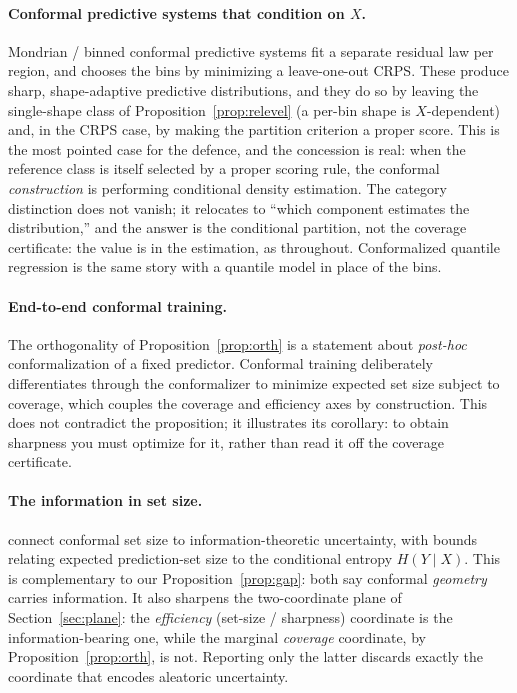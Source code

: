 \documentclass[11pt]{article}
\theoremstyle{definition}
\begin{document}
\paragraph{Conformal predictive systems that condition on $X$.}
Mondrian / binned conformal predictive systems \citep{bostrom2021mondrian} fit a separate
residual law per region, and \citet{toccaceli2026crps} chooses the bins by minimizing a
leave-one-out CRPS. These produce sharp, shape-adaptive predictive
distributions, and they do so by leaving the single-shape class of
Proposition~\ref{prop:relevel} (a per-bin shape is $X$-dependent) and, in the CRPS case,
by making the partition criterion a proper score. This is the most pointed case for the
defence, and the concession is real: when the reference class is itself selected by
a proper scoring rule, the conformal \emph{construction} is performing conditional density
estimation. The category distinction does not vanish; it relocates to ``which component
estimates the distribution,'' and the answer is the conditional partition, not the
coverage certificate: the value is in the estimation, as throughout. Conformalized
quantile regression \citep{romano2019conformalized} is the same story with a quantile
model in place of the bins.

\paragraph{End-to-end conformal training.}
The orthogonality of Proposition~\ref{prop:orth} is a statement about \emph{post-hoc}
conformalization of a fixed predictor. Conformal training
\citep{stutz2022learning,correia2024information} deliberately differentiates through the
conformalizer to minimize expected set size subject to coverage, which couples the
coverage and efficiency axes by construction. This does not contradict the proposition; it
illustrates its corollary: to obtain sharpness you must optimize for it, rather than
read it off the coverage certificate.

\paragraph{The information in set size.}
\citet{correia2024information} connect conformal set size to information-theoretic
uncertainty, with bounds relating expected prediction-set size to the conditional entropy
$H(Y\mid X)$. This is complementary to our
Proposition~\ref{prop:gap}: both say conformal \emph{geometry} carries information. It also
sharpens the two-coordinate plane of Section~\ref{sec:plane}: the \emph{efficiency}
(set-size / sharpness) coordinate is the information-bearing one, while the marginal
\emph{coverage} coordinate, by Proposition~\ref{prop:orth}, is not. Reporting only the
latter discards exactly the coordinate that encodes aleatoric uncertainty.
\end{document}
